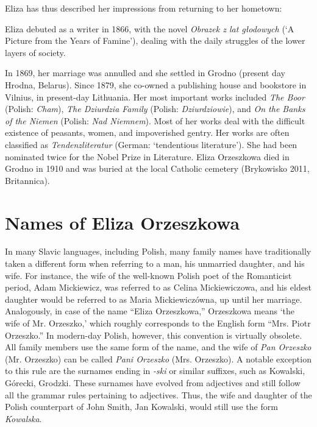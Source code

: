 Eliza has thus described her impressions from returning to her hometown:


Eliza debuted as a writer in 1866, with the novel \textit{Obrazek z lat głodowych} (`A Picture from the Years of Famine'), dealing with the daily struggles of the lower layers of society.

In 1869, her marriage was annulled and she settled in Grodno (present day Hrodna, Belarus).
Since 1879, she co-owned a publishing house and bookstore in Vilnius, in present-day Lithuania.
Her most important works included \textit{The Boor} (Polish: \textit{Cham}), \textit{The Dziurdzia Family} (Polish: \textit{Dziurdziowie}), and \textit{On the Banks of the Niemen} (Polish: \textit{Nad Niemnem}).
Most of her works deal with the difficult existence of peasants, women, and impoverished gentry.
Her works are often classified as \textit{Tendenzliteratur} (German: `tendentious literature').
She had been nominated twice for the Nobel Prize in Literature.
Eliza Orzeszkowa died in Grodno in 1910 and was buried at the local Catholic cemetery
(Brykowisko 2011, Britannica).

\section{Names of Eliza Orzeszkowa}
In many Slavic languages, including Polish, many family names have traditionally taken a different form when referring to a man, his unmarried daughter, and his wife.
For instance, the wife of the well-known Polish poet of the Romanticist period, Adam Mickiewicz, was referred to as Celina Mickiewiczowa, and his eldest daughter would be referred to as Maria Mickiewiczówna, up until her marriage.
Analogously, in case of the name ``Eliza Orzeszkowa,'' Orzeszkowa means `the wife of Mr. Orzeszko,' which roughly corresponds to the English form ``Mrs. Piotr Orzeszko.''
In modern-day Polish, however, this convention is virtually obsolete.
All family members use the same form of the name, and the wife of \textit{Pan Orzeszko} (Mr. Orzeszko) can be called \textit{Pani Orzeszko} (Mrs. Orzeszko).
A notable exception to this rule are the surnames ending in \textit{-ski} or similar suffixes, such as Kowalski, Górecki, Grodzki.
These surnames have evolved from adjectives and still follow all the grammar rules pertaining to adjectives.
Thus, the wife and daughter of the Polish counterpart of John Smith, Jan Kowalski, would still use the form \textit{Kowalska}. 


